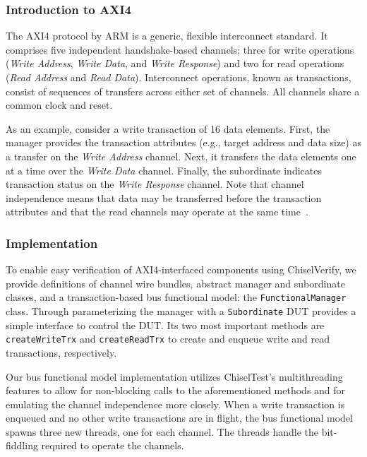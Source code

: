\documentclass[conference]{IEEEtran}
\begin{document}
\subsubsection{Introduction to AXI4}
The AXI4 protocol by ARM is a generic, flexible interconnect standard. It comprises five independent handshake-based channels; three for write operations (\textit{Write Address}, \textit{Write Data}, and \textit{Write Response}) and two for read operations (\textit{Read Address} and \textit{Read Data}). Interconnect operations, known as transactions, consist of sequences of transfers across either set of channels. All channels share a common clock and reset.

As an example, consider a write transaction of 16 data elements. First, the manager provides the transaction attributes (e.g., target address and data size) as a transfer on the \textit{Write Address} channel. 
Next, it transfers the data elements one at a time over the \textit{Write Data} channel. 
Finally, the subordinate indicates transaction status on the \textit{Write Response} channel. Note that channel independence means that data may be transferred before the transaction attributes and that the read channels may operate at the same time~\cite{axi4standard}.

\subsubsection{Implementation}
To enable easy verification of AXI4-interfaced components using ChiselVerify, we provide definitions of channel wire bundles, abstract manager and subordinate classes, and a transaction-based bus functional model: the \texttt{FunctionalManager} class. Through parameterizing the manager with a \texttt{Subordinate} DUT provides a simple interface to control the DUT. Its two most important methods are \texttt{createWriteTrx} and \texttt{createReadTrx} to create and enqueue write and read transactions, respectively.

Our bus functional model implementation utilizes ChiselTest's multithreading features to allow for non-blocking calls to the aforementioned methods and for emulating the channel independence more closely. When a write transaction is enqueued and no other write transactions are in flight, the bus functional model spawns three new threads, one for each channel. The threads handle the bit-fiddling required to operate the channels.
\end{document}
